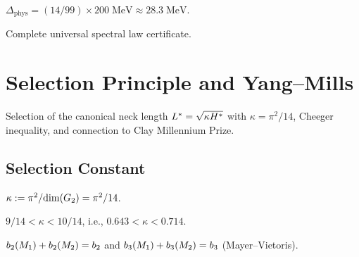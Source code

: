 \begin{theorem}\label{thm:physical_mass_gap}
    \leanok
    $\Delta_{\mathrm{phys}} = (14/99) \times 200\; \mathrm{MeV} \approx 28.3\; \mathrm{MeV}$.
\end{theorem}

\begin{theorem}\label{thm:universal_law_cert}
    \leanok
    Complete universal spectral law certificate.
\end{theorem}


\chapter{Selection Principle and Yang--Mills}\label{chap:selection}

Selection of the canonical neck length $L^* = \sqrt{\kappa H^*}$
with $\kappa = \pi^2/14$, Cheeger inequality, and connection to Clay Millennium Prize.

\section{Selection Constant}

\begin{definition}[$\kappa$]\label{def:kappa}
    \leanok
    $\kappa := \pi^2 / \mathrm{dim}(G_2) = \pi^2/14$.
\end{definition}

\begin{theorem}\label{thm:kappa_bounds}
    \leanok
    $9/14 < \kappa < 10/14$, i.e., $0.643 < \kappa < 0.714$.
\end{theorem}

\begin{theorem}\label{thm:building_blocks}
    \leanok
    $b_2(M_1) + b_2(M_2) = b_2$ and $b_3(M_1) + b_3(M_2) = b_3$ (Mayer--Vietoris).
\end{theorem}

